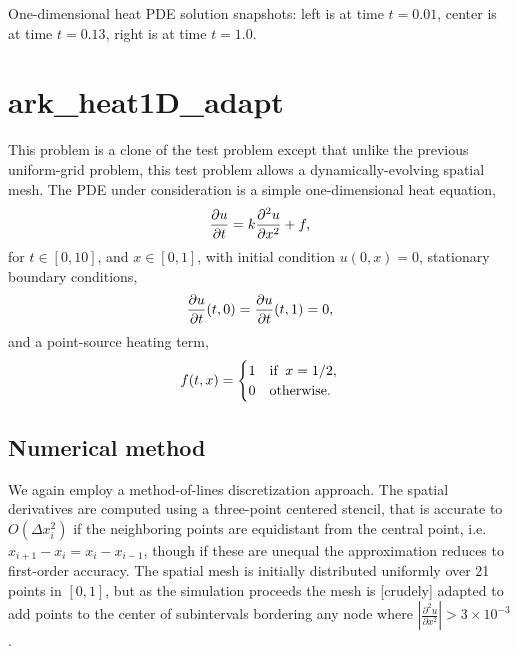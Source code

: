 \documentclass[letterpaper,10pt,english]{sphinxmanual}
\begin{document}
One-dimensional heat PDE solution snapshots: left is at time \(t=0.01\),
center is at time \(t=0.13\), right is at time \(t=1.0\).


\section{ark\_heat1D\_adapt}
\label{c_serial:id28}\label{c_serial:ark-heat1d-adapt}
This problem is a clone of the {\hyperref[c_serial:ark-heat1d]{\emph{}}} test problem except that
unlike the previous uniform-grid problem, this test problem allows a
dynamically-evolving spatial mesh.  The PDE under consideration is a
simple one-dimensional heat equation,
\begin{gather}
\begin{split}\frac{\partial u}{\partial t} = k \frac{\partial^2 u}{\partial x^2} + f,\end{split}\notag
\end{gather}
for \(t \in [0, 10]\), and \(x \in [0, 1]\), with initial
condition \(u(0,x) = 0\), stationary boundary conditions,
\begin{gather}
\begin{split}\frac{\partial u}{\partial t}(t,0) = \frac{\partial u}{\partial t}(t,1) = 0,\end{split}\notag
\end{gather}
and a point-source heating term,
\begin{gather}
\begin{split}f(t,x) = \begin{cases} 1 & \text{if}\;\; x=1/2, \\
                       0 & \text{otherwise}. \end{cases}\end{split}\notag
\end{gather}

\subsection{Numerical method}
\label{c_serial:id29}
We again employ a method-of-lines discretization approach.  The
spatial derivatives are computed using a three-point centered stencil,
that is accurate to \(O(\Delta x_i^2)\) if the neighboring points are
equidistant from the central point, i.e. \(x_{i+1} - x_i = x_i -
x_{i-1}\), though if these are unequal the approximation reduces to
first-order accuracy.  The spatial mesh is initially distributed
uniformly over 21 points in \([0,1]\), but as the simulation
proceeds the mesh is {[}crudely{]} adapted to add points to the center of
subintervals bordering any node where
\(\left|\frac{\partial^2 u}{\partial x^2}\right| > 3\times10^{-3}\).
\end{document}
